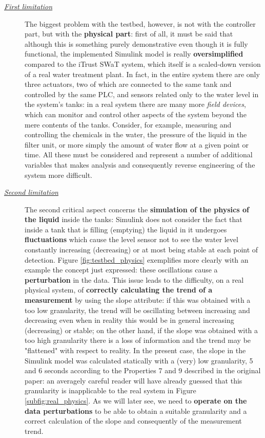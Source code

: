 \begin{description}
	\item[\emph{\underline{First limitation}}] The biggest problem with the testbed, however, is not with the controller part, but with the \textbf{physical part}: first of all, it must be said that although this is something purely demonstrative even though it is fully functional, the implemented Simulink model is really \textbf{oversimplified} compared to the iTrust SWaT system, which itself is a scaled-down version of a real water treatment plant. In fact, in the entire system there are only three actuators, two of which are connected to the same tank and controlled by the same PLC, and sensors related only to the water level in the system's tanks: in a real system there are many more \textit{field devices}, which can monitor and control other aspects of the system beyond the mere contents of the tanks. Consider, for example, measuring and controlling the chemicals in the water, the pressure of the liquid in the filter unit, or more simply the amount of water flow at a given point or time.\newline
	All these must be considered and represent a number of additional variables that makes analysis and consequently reverse engineering of the system more difficult.
	
	\item[\emph{\underline{Second limitation}}] The second critical aspect concerns the \textbf{simulation of the physics of the liquid} inside the tanks: Simulink does not consider the fact that inside a tank that is filling (emptying) the liquid in it undergoes \textbf{fluctuations} which cause the level sensor not to see the water level constantly increasing (decreasing) or at most being stable at each point of detection. Figure \ref{fig:testbed_physics} exemplifies more clearly with an example the concept just expressed: these oscillations cause a \textbf{perturbation} in the data.\newline
	This issue leads to the difficulty, on a real physical system, of \textbf{correctly calculating the trend of a measurement} by using the slope attribute: if this was obtained with a too low granularity, the trend will be oscillating between increasing and decreasing even when in reality this would be in general increasing (decreasing) or stable; on the other hand, if the slope was obtained with a too high granularity there is a loss of information and the trend may be "flattened" with respect to reality.\newline
	In the present case, the slope in the Simulink model was calculated statically with a (very) low granularity, 5 and 6 seconds according to the Properties 7 and 9 described in the original paper: an averagely careful reader will have already guessed that this granularity is inapplicable to the real system in Figure \ref{subfig:real_physics}. As we will later see, we need to \textbf{operate on the data perturbations} to be able to obtain a suitable granularity and a correct calculation of the slope and consequently of the measurement trend.
\end{description}
\vfill

